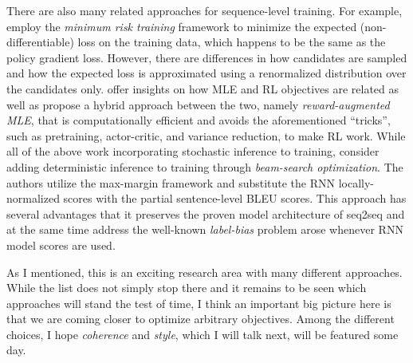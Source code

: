 There are also many related approaches for sequence-level training. For example, 
 employ the {\it minimum risk training} framework to minimize the expected (non-differentiable) loss on the training data, which happens to be the same as the policy gradient loss. However, there are differences in how candidates are sampled and how the expected loss is approximated using a renormalized distribution over the candidates only. 
 offer insights on how MLE and RL objectives are related as well as propose a hybrid approach between the two, namely {\it 
reward-augmented MLE}, that is computationally efficient and avoids the aforementioned ``tricks'', such as pretraining, actor-critic, and variance reduction, to make RL work.
While all of the above work incorporating stochastic inference to training,  consider adding deterministic inference to training through {\it beam-search optimization}.
The authors utilize the max-margin framework and substitute the RNN locally-normalized scores with the partial sentence-level BLEU scores. This approach has several advantages that it preserves the proven model architecture of seq2seq and at the same time address
the well-known {\it label-bias} problem \cite{lafferty01} arose whenever RNN model scores are used.

As I mentioned, this is an exciting research area with many different approaches. While the list does not simply stop there and it remains to be seen which approaches will stand the test of time, I think an important big picture here is that we are coming closer to optimize arbitrary objectives. Among the different choices, I hope {\it coherence} and {\it style}, which I will talk next, will be featured some day.

%
%
%
%
%
%
%
%
%
%


